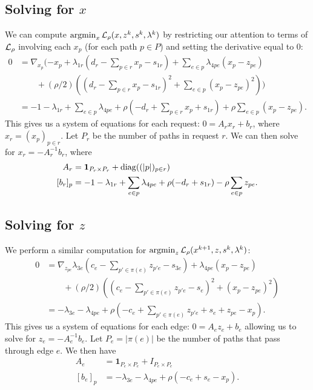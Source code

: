 \documentclass[11pt]{article}
\begin{document}
\subsection{Solving for $x$}
We can compute $\operatorname*{argmin}_{x} \mathcal{L}_\rho(x,z^k,s^k,\lambda^k)$ by restricting our
attention to terms of $\mathcal{L}_\rho$ involving each $x_p$ (for each path $p\in P$)
and setting the derivative equal to 0:
\begin{align*}
0
&= \nabla_{x_p}(-x_p + \lambda_{1r}(d_r - \sum_{p\in r}x_p - s_{1r})
    + \sum_{e\in p}\lambda_{4pe}(x_p - z_{pe})\\
    & \qquad + (\rho/2)((d_r - \sum_{p\in r}x_p - s_{1r})^2 + \sum_{e \in p}(x_p - z_{pe})^2))\\
&= -1 -\lambda_{1r} + \sum_{e \in p}\lambda_{4pe} + \rho(-d_r + \sum_{p\in r}x_p + s_{1r})
    +\rho\sum_{e \in p} (x_p - z_{pe}).
\end{align*}
This gives us a system of equations for each request: $0 = A_rx_r + b_r$,
where $x_r = (x_p)_{p\in r}$.
Let $P_r$ be the number of paths in request $r$.
We can then solve for $x_r = -A_r^{-1}b_r$,
where
\begin{align*}
A_r &= \mathbf{1}_{P_r\times P_r} + \mathrm{diag}((|p|)_{p\in r})\\
[b_r]_p &=
    -1 -\lambda_{1r} + \sum_{e \in p}\lambda_{4pe} + \rho(-d_r + s_{1r})
    - \rho\sum_{e \in p} z_{pe}.
\end{align*}

\subsection{Solving for $z$}
We perform a similar computation for $\operatorname*{argmin}_{z} \mathcal{L}_\rho(x^{k+1},z,s^k,\lambda^k)$:
\begin{align*}
0
&= \nabla_{z_{pe}}\lambda_{3e}(c_e - \sum_{p'\in\pi(e)} z_{p'e} - s_{3e})
    + \lambda_{4pe}(x_p - z_{pe})\\
& \qquad + (\rho/2)((c_e - \sum_{p'\in\pi(e)} z_{p'e} - s_e)^2 + (x_p - z_{pe})^2)\\
&= -\lambda_{3e} - \lambda_{4pe}
    + \rho(-c_e + \sum_{p'\in\pi(e)} z_{p'e} + s_e  + z_{pe} - x_p).
\end{align*}
This gives us a system of equations for each edge: $0 = A_ez_e + b_e$
allowing us to solve for $z_e = -A_e^{-1}b_e$.
Let $P_e= |\pi(e)|$ be the number of paths that pass through edge $e$.
We then have
\begin{align*}
A_e &= \mathbf{1}_{P_e\times P_e} + I_{P_e\times P_e}\\
[b_e]_p &= -\lambda_{3e} - \lambda_{4pe}
    + \rho(-c_e + s_e - x_p).
\end{align*}
\end{document}

